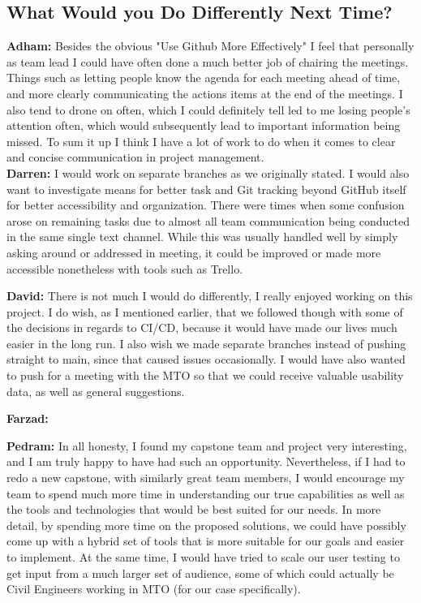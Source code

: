 \documentclass{article}
\begin{document}
\subsection{What Would you Do Differently Next Time?}

\textbf{Adham:} Besides the obvious "Use Github More Effectively" I feel that personally as team lead I could have often done a much better job of chairing the meetings. Things
such as letting people know the agenda for each meeting ahead of time, and more clearly communicating the actions items at the end of the meetings. I also tend to drone on 
often, which I could definitely tell led to me losing people's attention often, which would subsequently lead to important information being missed. To sum it up I think I have
a lot of work to do when it comes to clear and concise communication in project management.\\

\textbf{Darren:} I would work on separate branches as we originally stated. I would also want to investigate means for better task and Git tracking beyond GitHub itself for better accessibility and organization. There were times when some confusion arose on remaining tasks due to almost all team communication being conducted in the same single text channel. While this was usually handled well by simply asking around or addressed in meeting, it could be improved or made more accessible nonetheless with tools such as Trello.

\textbf{David:} There is not much I would do differently, I really enjoyed working on this project. I do wish, as I mentioned earlier, that we followed though with some of the decisions in regards to CI/CD, because it would have made our lives much easier in the long run. I also wish we made separate branches instead of pushing straight to main, since that caused issues occasionally. I would have also wanted to push for a meeting with the MTO so that we could receive valuable usability data, as well as general suggestions.

\textbf{Farzad:}

\textbf{Pedram:} In all honesty, I found my capstone team and project very interesting, and I am truly happy to have had such an opportunity. Nevertheless, if I had to redo a new capstone, with similarly great team members, I would encourage my team to spend much more time in understanding our true capabilities as well as the tools and technologies that would be best suited for our needs. In more detail, by spending more time on the proposed solutions, we could have possibly come up with a hybrid set of tools that is more suitable for our goals and easier to implement. At the same time, I would have tried to scale our user testing to get input from a much larger set of audience, some of which could actually be Civil Engineers working in MTO (for our case specifically). 
\end{document}
